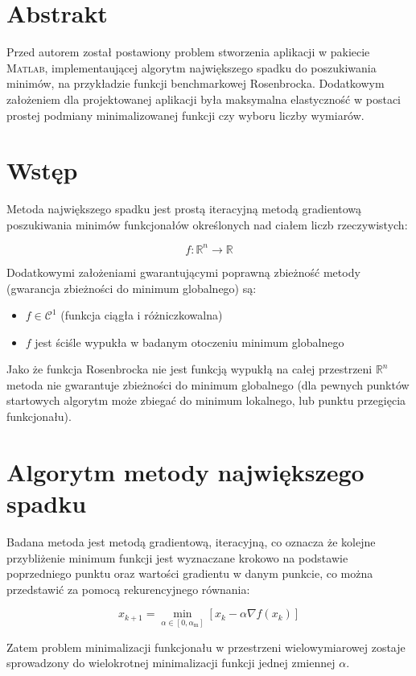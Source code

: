 \documentclass[12pt]{article}
\begin{document}
 


\section*{Abstrakt}

Przed autorem został postawiony problem stworzenia aplikacji w pakiecie
\textsc{Matlab}, implementaującej algorytm największego spadku
do poszukiwania minimów, na przykładzie funkcji benchmarkowej Rosenbrocka.
Dodatkowym założeniem dla projektowanej aplikacji była maksymalna elastyczność w
postaci prostej podmiany minimalizowanej funkcji czy wyboru liczby wymiarów.

\section*{Wstęp}

Metoda największego spadku jest prostą iteracyjną metodą gradientową
poszukiwania minimów funkcjonałów określonych nad ciałem liczb rzeczywistych:

\begin{equation*}
    f: \mathbb{R}^{n} \rightarrow \mathbb{R} 
\end{equation*}

Dodatkowymi założeniami gwarantującymi poprawną zbieżność metody (gwarancja
zbieżności do minimum globalnego) są:

\begin{itemize}
  \item $f \in \mathcal{C}^{1}$ (funkcja ciągła i różniczkowalna)
  \item $f$ jest ściśle wypukła w badanym otoczeniu minimum globalnego
\end{itemize}

Jako że funkcja Rosenbrocka nie jest funkcją wypukłą na całej przestrzeni
$\mathbb{R}^{n}$ metoda nie gwarantuje zbieżności do minimum globalnego (dla
pewnych punktów startowych algorytm może zbiegać do minimum lokalnego, lub
punktu przegięcia funkcjonału).

\section*{Algorytm metody największego spadku}

Badana metoda jest metodą gradientową, iteracyjną, co oznacza że kolejne
przybliżenie minimum funkcji jest wyznaczane krokowo na podstawie poprzedniego
punktu oraz wartości gradientu w danym punkcie, co można przedstawić za pomocą
rekurencyjnego równania:

\begin{equation}
    x_{k+1} = \min_{\alpha \in [0, \alpha_{\textrm{m}}]} \left[x_{k} - \alpha \nabla f(x_{k})\right]
\end{equation}

Zatem problem minimalizacji funkcjonału w przestrzeni wielowymiarowej zostaje
sprowadzony do wielokrotnej minimalizacji funkcji jednej zmiennej $\alpha$.
\end{document}
